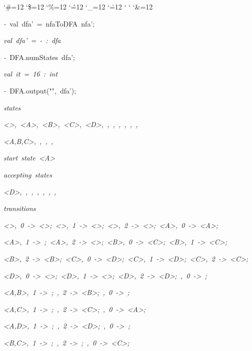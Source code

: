 \begin{list}{}
{\setlength{\leftmargin}{\leftmargini}
\setlength{\rightmargin}{0cm}
\setlength{\itemindent}{0cm}
\setlength{\listparindent}{0cm}
\setlength{\itemsep}{0cm}
\setlength{\parsep}{0cm}
\setlength{\labelsep}{0cm}
\setlength{\labelwidth}{0cm}
\catcode`\#=12
\catcode`\$=12
\catcode`\%=12
\catcode`\^=12
\catcode`\_=12
\catcode`\.=12
\catcode`
\catcode`
\catcode`\&=12
\ttfamily}
\small
\item[]\textsl{-\ }val\ dfa'\ =\ nfaToDFA\ nfa';
\item[]\textsl{val\ dfa'\ =\ -\ :\ dfa}
\item[]\textsl{-\ }DFA.numStates\ dfa';
\item[]\textsl{val\ it\ =\ 16\ :\ int}
\item[]\textsl{-\ }DFA.output("",\ dfa');
\item[]\textsl{states}
\item[]\textsl{<>,\ <A>,\ <B>,\ <C>,\ <D>,\ <A,B>,\ <A,C>,\ <A,D>,\ <B,C>,\ <B,D>,\ <C,D>,}
\item[]\textsl{<A,B,C>,\ <A,B,D>,\ <A,C,D>,\ <B,C,D>,\ <A,B,C,D>}
\item[]\textsl{start\ state\ <A>}
\item[]\textsl{accepting\ states}
\item[]\textsl{<D>,\ <A,D>,\ <B,D>,\ <C,D>,\ <A,B,D>,\ <A,C,D>,\ <B,C,D>,\ <A,B,C,D>}
\item[]\textsl{transitions}
\item[]\textsl{<>,\ 0\ ->\ <>;\ <>,\ 1\ ->\ <>;\ <>,\ 2\ ->\ <>;\ <A>,\ 0\ ->\ <A>;}
\item[]\textsl{<A>,\ 1\ ->\ <A,B>;\ <A>,\ 2\ ->\ <>;\ <B>,\ 0\ ->\ <C>;\ <B>,\ 1\ ->\ <C>;}
\item[]\textsl{<B>,\ 2\ ->\ <B>;\ <C>,\ 0\ ->\ <D>;\ <C>,\ 1\ ->\ <D>;\ <C>,\ 2\ ->\ <C>;}
\item[]\textsl{<D>,\ 0\ ->\ <>;\ <D>,\ 1\ ->\ <>;\ <D>,\ 2\ ->\ <D>;\ <A,B>,\ 0\ ->\ <A,C>;}
\item[]\textsl{<A,B>,\ 1\ ->\ <A,B,C>;\ <A,B>,\ 2\ ->\ <B>;\ <A,C>,\ 0\ ->\ <A,D>;}
\item[]\textsl{<A,C>,\ 1\ ->\ <A,B,D>;\ <A,C>,\ 2\ ->\ <C>;\ <A,D>,\ 0\ ->\ <A>;}
\item[]\textsl{<A,D>,\ 1\ ->\ <A,B>;\ <A,D>,\ 2\ ->\ <D>;\ <B,C>,\ 0\ ->\ <C,D>;}
\item[]\textsl{<B,C>,\ 1\ ->\ <C,D>;\ <B,C>,\ 2\ ->\ <B,C>;\ <B,D>,\ 0\ ->\ <C>;}

\end{list}
